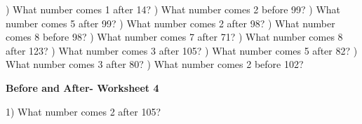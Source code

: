 \documentclass{article}%
\begin{document}
\newline%
) What number comes 1 after 14?%
\newline%
\newline%
) What number comes 2 before 99?%
\newline%
\newline%
) What number comes 5 after 99?%
\newline%
\newline%
) What number comes 2 after 98?%
\newline%
\newline%
) What number comes 8 before 98?%
\newline%
\newline%
) What number comes 7 after 71?%
\newline%
\newline%
) What number comes 8 after 123?%
\newline%
\newline%
) What number comes 3 after 105?%
\newline%
\newline%
) What number comes 5 after 82?%
\newline%
\newline%
) What number comes 3 after 80?%
\newline%
\newline%
) What number comes 2 before 102?%
\newline%
\newline%
\newline%
\pagebreak%
\large%
\begin{center}%
\textbf{Before and After- Worksheet 4}%
\newline%
\newline%
\newline%
\end{center} \normalsize%
1) What number comes 2 after 105?%
\newline%
\newline%
\end{document}
